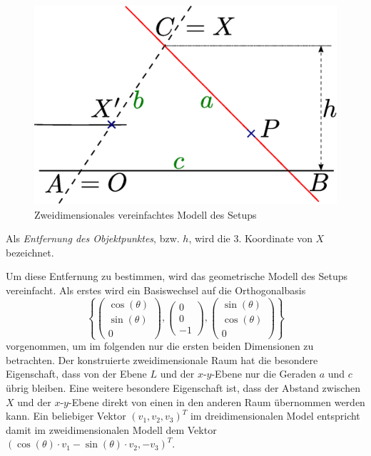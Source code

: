 \documentclass[ngerman,a4paper,parskip=half]{scrartcl}
\begin{document}
\begin{figure}
	\centering
	\includegraphics[width=\linewidth]{includes/triangulation2d}
	\caption{Zweidimensionales vereinfachtes Modell des Setups}
\end{figure}

Als \emph{Entfernung des Objektpunktes}, bzw. $h$, wird die 3. Koordinate von $X$ bezeichnet.

Um diese Entfernung zu bestimmen, wird das geometrische Modell des Setups vereinfacht. Als erstes wird ein Basiswechsel auf die Orthogonalbasis
\[ \left\lbrace \begin{pmatrix}
\cos(\theta) \\ \sin(\theta) \\ 0
\end{pmatrix}, \begin{pmatrix}
0 \\ 0 \\ -1
\end{pmatrix}, \begin{pmatrix}
\sin(\theta) \\ \cos(\theta) \\ 0
\end{pmatrix} \right\rbrace \]
vorgenommen, um im folgenden nur die ersten beiden Dimensionen zu betrachten. Der konstruierte zweidimensionale Raum hat die besondere Eigenschaft, dass von der Ebene $L$ und der $x$-$y$-Ebene nur die Geraden $a$ und $c$ übrig bleiben. Eine weitere besondere Eigenschaft ist, dass der Abstand zwischen $X$ und der $x$-$y$-Ebene direkt von einen in den anderen Raum übernommen werden kann. Ein beliebiger Vektor $(v_1, v_2, v_3)^T$ im dreidimensionalen Model entspricht damit im zweidimensionalen Modell dem Vektor $(\cos(\theta) \cdot v_1 - \sin(\theta) \cdot v_2, -v_3)^T$.
\end{document}
